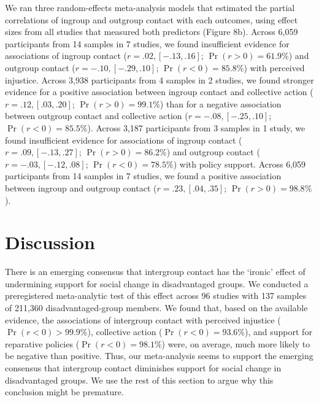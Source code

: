 \documentclass[twocolumn, 11pt, letterpaper]{article}
\begin{document}
We ran three random-effects meta-analysis models that estimated the
partial correlations of ingroup and outgroup contact with each outcomes,
using effect sizes from all studies that measured both predictors
(Figure 8b). Across 6,059 participants from 14 samples in 7 studies, we
found insufficient evidence for associations of ingroup contact
(\(r = .02, [-.13, .16]\); \(\Pr (r > 0) = 61.9\%\)) and outgroup
contact (\(r = -.10, [-.29, .10]\); \(\Pr (r < 0) = 85.8\%\)) with
perceived injustice. Across 3,938 participants from 4 samples in 2
studies, we found stronger evidence for a positive association between
ingroup contact and collective action (\(r = .12, [.03, .20]\);
\(\Pr (r > 0) = 99.1\%\)) than for a negative association between
outgroup contact and collective action (\(r = -.08, [-.25, .10]\);
\(\Pr (r < 0) = 85.5\%\)). Across 3,187 participants from 3 samples in 1
study, we found insufficient evidence for associations of ingroup
contact (\(r = .09, [-.13, .27]\); \(\Pr (r > 0) = 86.2\%\)) and
outgroup contact (\(r = -.03, [-.12, .08]\); \(\Pr (r < 0) = 78.5\%\))
with policy support. Across 6,059 participants from 14 samples in 7
studies, we found a positive association between ingroup and outgroup
contact (\(r = .23, [.04, .35]\); \(\Pr (r > 0) = 98.8\%\)).

\hypertarget{discussion}{%
\section{Discussion}\label{discussion}}

There is an emerging consensus that intergroup contact has the `ironic'
effect of undermining support for social change in disadvantaged groups.
We conducted a preregistered meta-analytic test of this effect across 96
studies with 137 samples of 211,360 disadvantaged-group members. We
found that, based on the available evidence, the associations of
intergroup contact with perceived injustice (\(\Pr (r < 0) > 99.9\%\)),
collective action (\(\Pr (r < 0) = 93.6\%\)), and support for reparative
policies (\(\Pr (r < 0) = 98.1\%\)) were, on average, much more likely
to be negative than positive. Thus, our meta-analysis seems to support
the emerging consensus that intergroup contact diminishes support for
social change in disadvantaged groups. We use the rest of this section
to argue why this conclusion might be premature.
\end{document}
